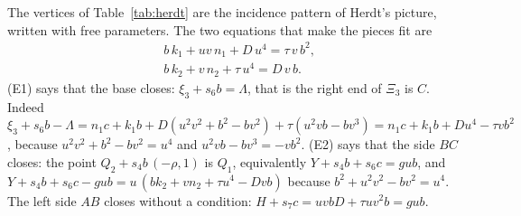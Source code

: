 \documentclass[11pt,reqno]{amsart}
\theoremstyle{plain}
\theoremstyle{definition}
\begin{document}
The vertices of Table~\ref{tab:herdt} are the incidence pattern of Herdt's picture, written with free parameters. The two equations that make the pieces fit are
\begin{align}
&b\,k_1+uv\,n_1+D\,u^4=\tau\,v\,b^2, \tag{E1}\\
&b\,k_2+v\,n_2+\tau\,u^4=D\,v\,b. \tag{E2}
\end{align}
(E1) says that the base closes: $\xi_3+s_6b=\Lambda$, that is the right end of $\Xi_3$ is $C$. Indeed $\xi_3+s_6b-\Lambda=n_1c+k_1b+D(u^2v^2+b^2-bv^2)+\tau(u^2vb-bv^3)=n_1c+k_1b+Du^4-\tau vb^2$, because $u^2v^2+b^2-bv^2=u^4$ and $u^2vb-bv^3=-vb^2$.
(E2) says that the side $BC$ closes: the point $Q_2+s_4b\,(-\rho,1)$ is $Q_1$, equivalently $Y+s_4b+s_6c=gub$, and $Y+s_4b+s_6c-gub=u\,(b k_2+vn_2+\tau u^4-Dvb)$ because $b^2+u^2v^2-bv^2=u^4$. The left side $AB$ closes
without a condition: $H+s_7c=uvbD+\tau uv^2b=gub$.
\end{document}

